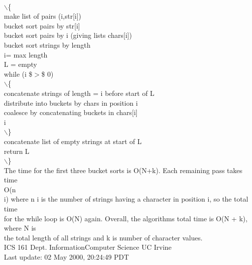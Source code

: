 \documentclass[a4paper,11pt]{article}
\begin{document}
\begin{flushleft}
{\\ $\backslash$\{
\\ make list of pairs (i,str[i])
\\ bucket sort pairs by str[i]
\\ bucket sort pairs by i (giving lists chars[i])
\\ bucket sort strings by length
\\ i= max length
\\ L = empty
\\ while (i \$$>$\$ 0)
\\ $\backslash$\{
\\ concatenate strings of length = i before start of L
\\ distribute into buckets by chars in position i
\\ coalesce by concatenating buckets in chars[i]
\\ i
\vspace{1em}\\ $\backslash$\}
\\ concatenate list of empty strings at start of L
\\ return L
\\ $\backslash$\}
\\ }
{
\raggedleft
The time for the first three bucket sorts is O(N+k). Each remaining pass takes time
\\ }
{
O(n
\\ }
{
\raggedleft
i) where n i is the number of strings having a character in position i, so the total time
\\ for the while loop is O(N) again. Overall, the algorithms total time is O(N + k), where N is
\\ }
{
the total length of all strings and k is number of character values.
\\ ICS 161 Dept. Information\space Computer Science UC Irvine
\\ Last update: 02 May 2000, 20:24:49 PDT
}
\end{flushleft}
\newpage
\end{document}
